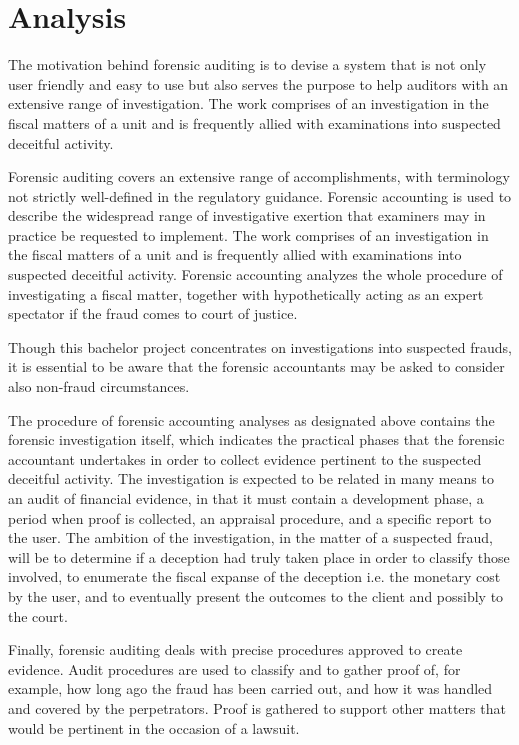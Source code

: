 \chapter{Analysis}\label{Analysis}

The motivation behind forensic auditing is to devise a system that is not only user friendly and easy to use but also serves the purpose to help auditors with an extensive range of investigation. The work comprises of an investigation in the fiscal matters of a unit and is frequently allied with examinations into suspected deceitful activity.

Forensic auditing covers an extensive range of accomplishments, with terminology not strictly well-defined in the regulatory guidance. Forensic accounting is used to describe the widespread range of investigative exertion that examiners may in practice be requested to implement. The work comprises of an investigation in the fiscal matters of a unit and is frequently allied with examinations into suspected deceitful activity. Forensic accounting analyzes the whole procedure of investigating a fiscal matter, together with hypothetically acting as an expert spectator if the fraud comes to court of justice. 

Though this bachelor project concentrates on investigations into suspected frauds, it is essential to be aware that the forensic accountants may be asked to consider also non-fraud circumstances.

The procedure of forensic accounting analyses as designated above contains the forensic investigation itself, which indicates the practical phases that the forensic accountant undertakes in order to collect evidence pertinent to the suspected deceitful activity. The investigation is expected to be related in many means to an audit of financial evidence, in that it must contain a development phase, a period when proof is collected, an appraisal procedure, and a specific report to the user. The ambition of the investigation, in the matter of a suspected fraud, will be to determine if a deception had truly taken place in order to classify those involved, to enumerate the fiscal expanse of the deception i.e. the monetary cost by the user, and to eventually present the outcomes to the client and possibly to the court. 


Finally, forensic auditing deals with precise procedures approved to create evidence. Audit procedures are used to classify and to gather proof of, for example, how long ago the fraud has been carried out, and how it was handled and covered by the perpetrators. Proof is gathered to support other matters that would be pertinent in the occasion of a lawsuit. 


